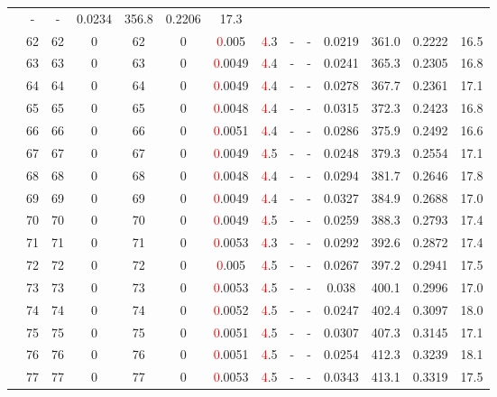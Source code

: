 \begin{table}[htb]
{\begin{tabular}{|c|c|c|c|c|c|c|c|c|c|c|c|c|c|}
 & - & -
 & 0.0234 & 356.8
 & 0.2206 & 17.3
 \\
 & 
62 & 62 & 0 & 62 & 0
 & \textcolor{red}0.005 & \textcolor{red}4.3
 & - & -
 & 0.0219 & 361.0
 & 0.2222 & 16.5
 \\
 & 
63 & 63 & 0 & 63 & 0
 & \textcolor{red}0.0049 & \textcolor{red}4.4
 & - & -
 & 0.0241 & 365.3
 & 0.2305 & 16.8
 \\
 & 
64 & 64 & 0 & 64 & 0
 & \textcolor{red}0.0049 & \textcolor{red}4.4
 & - & -
 & 0.0278 & 367.7
 & 0.2361 & 17.1
 \\
 & 
65 & 65 & 0 & 65 & 0
 & \textcolor{red}0.0048 & \textcolor{red}4.4
 & - & -
 & 0.0315 & 372.3
 & 0.2423 & 16.8
 \\
 & 
66 & 66 & 0 & 66 & 0
 & \textcolor{red}0.0051 & \textcolor{red}4.4
 & - & -
 & 0.0286 & 375.9
 & 0.2492 & 16.6
 \\
 & 
67 & 67 & 0 & 67 & 0
 & \textcolor{red}0.0049 & \textcolor{red}4.5
 & - & -
 & 0.0248 & 379.3
 & 0.2554 & 17.1
 \\
 & 
68 & 68 & 0 & 68 & 0
 & \textcolor{red}0.0048 & \textcolor{red}4.4
 & - & -
 & 0.0294 & 381.7
 & 0.2646 & 17.8
 \\
 & 
69 & 69 & 0 & 69 & 0
 & \textcolor{red}0.0049 & \textcolor{red}4.4
 & - & -
 & 0.0327 & 384.9
 & 0.2688 & 17.0
 \\
 & 
70 & 70 & 0 & 70 & 0
 & \textcolor{red}0.0049 & \textcolor{red}4.5
 & - & -
 & 0.0259 & 388.3
 & 0.2793 & 17.4
 \\
 & 
71 & 71 & 0 & 71 & 0
 & \textcolor{red}0.0053 & \textcolor{red}4.3
 & - & -
 & 0.0292 & 392.6
 & 0.2872 & 17.4
 \\
 & 
72 & 72 & 0 & 72 & 0
 & \textcolor{red}0.005 & \textcolor{red}4.5
 & - & -
 & 0.0267 & 397.2
 & 0.2941 & 17.5
 \\
 & 
73 & 73 & 0 & 73 & 0
 & \textcolor{red}0.0053 & \textcolor{red}4.5
 & - & -
 & 0.038 & 400.1
 & 0.2996 & 17.0
 \\
 & 
74 & 74 & 0 & 74 & 0
 & \textcolor{red}0.0052 & \textcolor{red}4.5
 & - & -
 & 0.0247 & 402.4
 & 0.3097 & 18.0
 \\
 & 
75 & 75 & 0 & 75 & 0
 & \textcolor{red}0.0051 & \textcolor{red}4.5
 & - & -
 & 0.0307 & 407.3
 & 0.3145 & 17.1
 \\
 & 
76 & 76 & 0 & 76 & 0
 & \textcolor{red}0.0051 & \textcolor{red}4.5
 & - & -
 & 0.0254 & 412.3
 & 0.3239 & 18.1
 \\
 & 
77 & 77 & 0 & 77 & 0
 & \textcolor{red}0.0053 & \textcolor{red}4.5
 & - & -
 & 0.0343 & 413.1
 & 0.3319 & 17.5
 \\

\end{tabular}}
\end{table}
